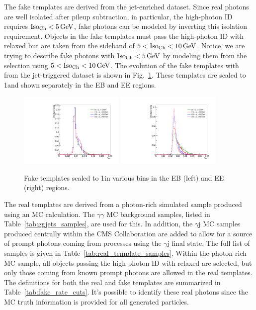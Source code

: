 The fake templates are derived from the jet-enriched dataset. Since real photons are well isolated after pileup subtraction, in particular, the high-\pt photon ID requires $\text{Iso}_{\text{Ch}} < 5\,\text{Ge\hspace{-.08em}V}$, fake photons can be modeled by inverting this isolation requirement. Objects in the fake templates must pass the high-\pt photon ID with \sieie relaxed but are taken from the sideband of $5 < \text{Iso}_{\text{Ch}} < 10\,\text{Ge\hspace{-.08em}V}$. Notice, we are trying to describe fake photons with $\text{Iso}_{\text{Ch}} < 5\,\text{Ge\hspace{-.08em}V}$ by modeling them from the selection using $5 < \text{Iso}_{\text{Ch}} < 10\,\text{Ge\hspace{-.08em}V}$. The evolution of the fake templates with \pt from the jet-triggered dataset is shown in Fig.~\ref{fig:fake_templates}. These templates are scaled to 1\fbinv and shown separately in the EB and EE regions.

\begin{figure}[!htbp]
  \centering
  \includegraphics[width=0.45\textwidth]{figures/faketemplatecompEB.pdf}
  \includegraphics[width=0.45\textwidth]{figures/faketemplatecompEE.pdf}
  \caption{Fake templates scaled to 1\fbinv in various \pt bins in the EB (left) and EE (right) regions.}
  \label{fig:fake_templates}
\end{figure}

The real templates are derived from a photon-rich simulated sample produced using an MC calculation. The $\gamma\gamma$ MC background samples, listed in Table~\ref{tab:ggjets_samples}, are used for this. In addition, the $\gamma$j MC samples produced centrally within the CMS Collaboration are added to allow for a source of prompt photons coming from processes using the $\gamma$j final state. The full list of samples is given in Table~\ref{tab:real_template_samples}. Within the photon-rich MC sample, all objects passing the high-\pt photon ID with relaxed \sieie are selected, but only those coming from known prompt photons are allowed in the real templates. The definitions for both the real and fake templates are summarized in Table~\ref{tab:fake_rate_cuts}. It's possible to identify these real photons since the MC truth information is provided for all generated particles.

